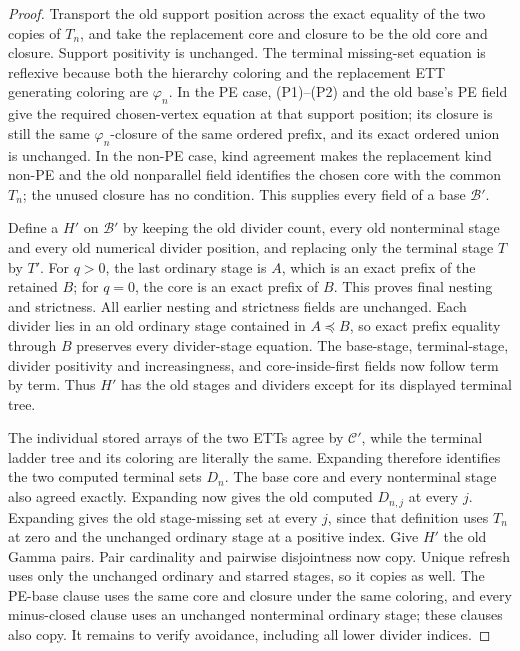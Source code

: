\begin{proof}
Transport the old support position across the exact equality of the two
copies of \(T_n\), and take the replacement core and closure to be the old
core and closure.  Support positivity is unchanged.  The terminal
missing-set equation is reflexive because both the hierarchy coloring and
the replacement ETT generating coloring are \(\varphi_n\).  In the PE
case, (P1)--(P2) and the old base's PE field give the required chosen-vertex
equation at that support position; its closure is still the same
\(\varphi_n\)-closure of the same ordered prefix, and its exact ordered
union is unchanged.  In the non-PE case, kind agreement makes the
replacement kind non-PE and the old nonparallel field identifies the
chosen core with the common \(T_n\); the unused closure has no condition.
This supplies every field of a base \(\mathcal B'\).

Define a  \(H'\) on \(\mathcal B'\) by keeping
the old divider count, every old nonterminal stage and every old numerical
divider position, and replacing only the terminal stage \(T\) by \(T'\).
For \(q>0\), the last ordinary stage is \(A\), which is an exact prefix of
the retained \(B\); for \(q=0\), the core is an exact prefix of \(B\).
This proves final nesting and strictness.  All earlier nesting and
strictness fields are unchanged.  Each divider lies in an old ordinary
stage contained in \(A\preccurlyeq B\), so exact prefix equality through
\(B\) preserves every divider-stage equation.  The base-stage,
terminal-stage, divider positivity and increasingness, and core-inside-first
fields now follow term by term.  Thus \(H'\) has the old stages and
dividers except for its displayed terminal tree.

The individual stored arrays of the two ETTs agree by \(\mathcal C'\),
while the terminal ladder tree and its coloring are literally the same.
Expanding  therefore identifies the two
computed terminal sets \(D_n\).  The base core and every nonterminal stage
also agreed exactly.  Expanding  now gives
the old computed
\(D_{n,j}\) at every \(j\).  Expanding
 gives the old stage-missing set at
every \(j\), since that definition uses \(T_n\) at zero and the unchanged
ordinary stage at a positive index.  Give \(H'\) the old Gamma pairs.
Pair cardinality and pairwise disjointness now copy.  Unique refresh uses
only the unchanged ordinary and starred stages, so it copies as well.  The
PE-base clause uses the same core and closure under the same coloring, and
every minus-closed clause uses an unchanged nonterminal ordinary stage;
these clauses also copy.  It remains to verify avoidance, including all
lower divider indices.


\end{proof}
